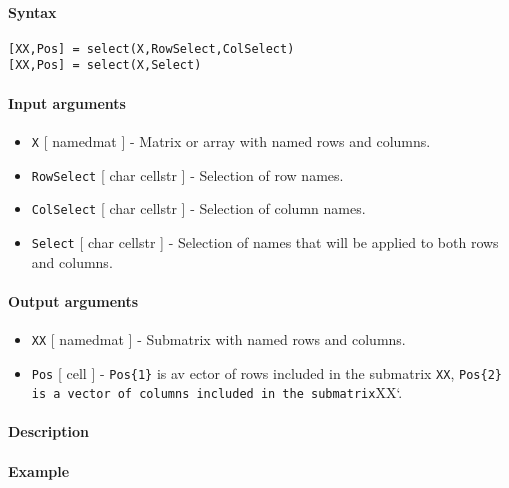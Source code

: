 


	\paragraph{Syntax}

\begin{verbatim}
[XX,Pos] = select(X,RowSelect,ColSelect)
[XX,Pos] = select(X,Select)
\end{verbatim}

\paragraph{Input arguments}

\begin{itemize}
\item
  \texttt{X} {[} namedmat {]} - Matrix or array with named rows and
  columns.
\item
  \texttt{RowSelect} {[} char \textbar{} cellstr {]} - Selection of row
  names.
\item
  \texttt{ColSelect} {[} char \textbar{} cellstr {]} - Selection of
  column names.
\item
  \texttt{Select} {[} char \textbar{} cellstr {]} - Selection of names
  that will be applied to both rows and columns.
\end{itemize}

\paragraph{Output arguments}

\begin{itemize}
\item
  \texttt{XX} {[} namedmat {]} - Submatrix with named rows and columns.
\item
  \texttt{Pos} {[} cell {]} - \texttt{Pos\{1\}} is av ector of rows
  included in the submatrix \texttt{XX},
  \texttt{Pos\{2\} is a vector of columns included in the submatrix}XX`.
\end{itemize}

\paragraph{Description}

\paragraph{Example}


